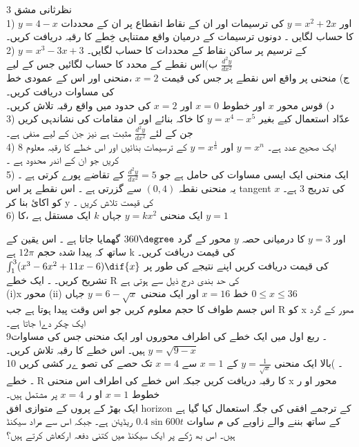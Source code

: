 نظرثانی مشق 3\\

1) 
\(y=4-x\)
اور
\(y=x^{2}+2x\)
کی ترسیمات اور ان کے نقاط انقطاع پر ان کے محددات کا حساب لگایں ۔
دونوں ترسیمات کے درمیان واقع ممتناہی خِطے کا رقبہ دریافت کریں۔\\
2)
\( y=x^{3}-3x+3\) 
کے ترسیم پر ساکن نقاط کے محددات کا حساب لگایں۔\\
ب)اس نقطے کے محدد کا حساب لگائیں جس کے لیے
\(\frac{d^{2}y}{dx^{2}}\)\\
ج) منحنی پر واقع اس نقطے پر جس کی قیمت
\( x=2\)
 ،منحنی اور اس کے عمودی خط کی مساوات دریافت کریں۔\\
 د)  قوس محور
\(x\)
اور خطوط
\(x=0\)
 اور
\(x=2\)
کی حدود میں واقع رقبہ تلاش کریں۔ \\
3)   عدّاد استعمال کیے بغیر 
\(y=x^4-x^5\)
کا خاکہ بنائے اور ان مقامات کی نشاندہی کریں جن کے لئے
 \(\frac{d^{2}y}{dx^{2}}\)
مثبت ہے نیز جن کے لیے منفی ہے۔\\
4)
\(8\)
ایک صحیح عدد ہے۔
\(y=x^{n}\)
اور
\(y=x^{\frac{1}{n}}\)
کے ترسیمات بنائیں اور اس خطے کا رقبہ معلوم کریں جو ان کے اندر محدود ہے ۔\\
5) ایک منحنی ایک ایسی مساوات کی حامل ہے جو
\(\frac{d^{2}y}{dx^{2}}=5\)
کے تقاضے پورے کرتی ہے ۔
یہ منحنی نقطہ
\((0,4)\)
سے گزرتی ہے ۔ اس نقطے پر اس
tangent
کی تدریج
\(3\)
ہے۔
\(x\)
 کو اکائ بنا کر y کی قیمت تلاش کریں ۔\\
6) ایک منحنی
\(y=k x^{2}\) 
 جہاں
\(k\)
ایک مستقل ہے ،کا
\(y=1\)

اور
\(y=3\)
کا درمیانی حصہ
\(y\)
محور کے گرد
\(360\degree\)
گھمایا جاتا ہے ۔ اس یقین کے ساتھ کہ پیدا شدہ حجم
\(12 \pi\)  
ہے k کی قیمت دریافت کریں۔\\

\(\int_{1}^{3}(x^{3}-6x^{2}+11x-6)\dif{x}\)
کی قیمت دریافت کریں اپنے نتیجے کی طور پر تشریح کریں۔
۔ ایک خطے
R
کی حد بندی درج ذیل سے ہوتی ہے \\
(i)x
محور 
(ii)
خط
\(x=16\)
اور ایک منحنی
\(y=6-\sqrt{x}\)
جہاں
\(0\le x\le 36\)\\
اس جسم طواف کا حجم معلوم کریں جو اس وقت پیدا ہوتا ہے جب
R
 کو
x
مھور کے گرد ایک چکر دےا جاتا ہے۔\\ 
9۔ ربع اول میں ایک خطے کی اطراف محوروں اور ایک منحنی جس کی مساوات
\(y=\sqrt{9-x}\)
ہیں۔ اس خطے کا رقبہ تلاش کریں۔\\
10 ۔ )بالا ایک منحنی
\(y=\frac{1}{\sqrt{x}}\)
کے
\(x=1\)
سے
\(x=4\)
تک حصے کی تصو ےر کشی کریں\\۔
خطے
R
کا رقبہ 
دریافت کریں جبکہ اس خطے کی اطراف اس منحنی 
x
محور 
او ر
خطوط 
\(x=1\)
او ر
\(x=4\)
پر مشتمل ہیں۔\\
ایک بھڑ کے پروں کے متوازی افق
horizon
کے ترجمے افقی کی جگہ استعمال کیا گیا ہے
کے ساتھ بننے
والے زاویے کی م ساوات
\(0.4\sin{600t}\)
ریڈیئن ہے۔ جبکہ اس سے مراد سیکنڈ ہیں۔ اس بھ ڑکے پر ایک سیکنڈ میں کتنی دفعہ ارکعاش کرتے ہیں؟\\

